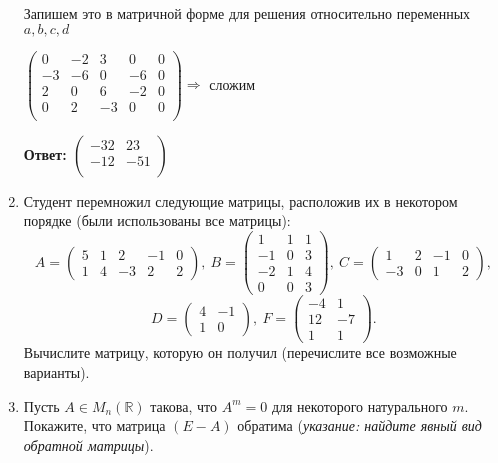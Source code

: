 \documentclass[a4paper,12pt]{article}
\begin{document}
\begin{enumerate}
Запишем это в матричной форме для решения относительно переменных $a,b,c,d$

$\left(\begin{array}{cccc|c}  
 0 & -2 & 3 & 0 & 0 \\  
 -3 & -6 & 0 & -6 & 0  \\ 
 2 & 0 & 6 & -2 & 0  \\ 
 0 & 2 & -3 & 0 & 0  \\
\end{array}\right) \Rightarrow$ сложим 


\textbf{Ответ: $\begin{pmatrix}
-32 & 23\\
-12 & -51\\
\end{pmatrix}$}

\vspace{5pt}
\item Студент перемножил следующие матрицы, расположив их в некотором порядке (были использованы все матрицы):
$$
A = 
\begin{pmatrix}
5 & 1 & 2 & -1 & 0\\
1 & 4 & -3 & 2 & 2
\end{pmatrix}, \
B =\begin{pmatrix}
1 & 1 & 1\\
-1 & 0 & 3\\
-2 & 1 & 4\\
0 & 0 & 3
\end{pmatrix}, \
C = \begin{pmatrix}
1 & 2 & -1 & 0\\
-3 & 0 & 1 & 2
\end{pmatrix},$$
$$
D = 
\begin{pmatrix}
4 & -1\\
1 & 0
\end{pmatrix}, \
F = \begin{pmatrix}
-4 & 1\\
12 & -7\\
1 & 1
\end{pmatrix}.
$$
Вычислите матрицу, которую он получил (перечислите все возможные варианты).


\vspace{5pt}

\item Пусть $A\in M_n(\mathbb{R})$ такова, что $A^m = 0$ для некоторого натурального $m$. Покажите, что матрица $(E - A)$ обратима ({\it указание: найдите явный вид обратной матрицы}).

\vspace{5pt}


\end{enumerate}
\end{document}

